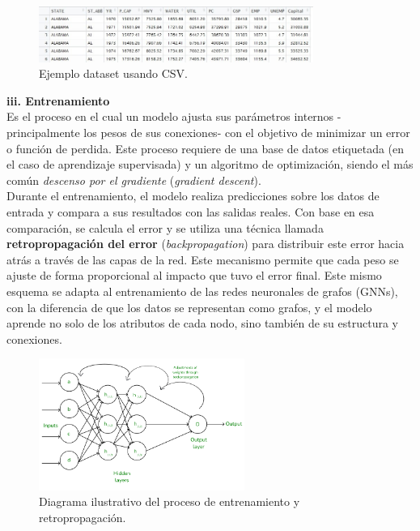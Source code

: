 \documentclass[11pt]{article} %
\begin{document}
\begin{figure}[H]
    \centering
    \includegraphics[width=0.8\textwidth]{Images/ejemplo csv2.jpg}
    \caption{Ejemplo dataset usando CSV.}
    \label{fig:Dataset-CSV}
\end{figure}
\vspace{8pt}
\textbf{iii. Entrenamiento} \\[3pt]
Es el proceso en el cual un modelo ajusta sus parámetros internos -principalmente los pesos de sus conexiones- con el objetivo de minimizar un error o función de perdida. Este proceso requiere de una base de datos etiquetada (en el caso de aprendizaje supervisada) y un algoritmo de optimización, siendo el más común \textit{descenso por el gradiente} (\textit{gradient descent}).\\[1pt]
Durante el entrenamiento, el modelo realiza predicciones sobre los datos de entrada y compara a sus resultados con las salidas reales. Con base en esa comparación, se calcula el error y se utiliza una técnica llamada \textbf{retropropagación del error} 
(\textit{backpropagation}) para distribuir este error hacia atrás a través de las capas de la red. Este mecanismo permite que cada peso se ajuste de forma proporcional al impacto que tuvo el error final. Este mismo esquema se adapta al entrenamiento de las redes neuronales de grafos (GNNs), con la diferencia de que los datos se representan como grafos, y el modelo aprende no solo de los atributos de cada nodo, sino también de su estructura y conexiones.
\begin{figure}[H]
    \centering
    \includegraphics[width = 0.6\textwidth]{Images/Frame-13.png}
    \caption{Diagrama ilustrativo del proceso de entrenamiento y retropropagación.}
    \label{fig:Backpropagaion}
\end{figure}
\end{document}
